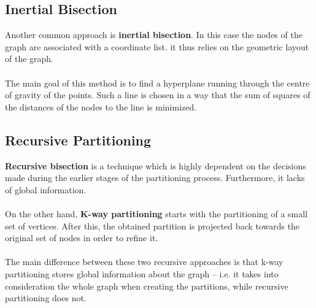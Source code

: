 \documentclass{article}
\begin{document}
\subsection{Inertial Bisection}
Another common approach is \textbf{inertial bisection}. In this case the nodes of the graph are associated with a coordinate list. it thus relies on the geometric layout of the graph. \\ \\
The main goal of this method is to find a hyperplane running through the centre of gravity of the points. Such a line is chosen in a way that the sum of squares of the distances of the nodes to the line is minimized.

\subsection{Recursive Partitioning}
\textbf{Recursive bisection} is a technique which is highly dependent on the decisions made during the earlier stages of the partitioning process. Furthermore, it lacks of global information. \\ \\
On the other hand, \textbf{K-way partitioning} starts with the partitioning of a small set of vertices. After this, the obtained partition is projected back towards the original set of nodes in order to refine it. \\ \\
The main difference between these two recursive approaches is that k-way partitioning stores global information about the graph -- i.e. it takes into consideration the whole graph when creating the partitions, while recursive partitioning does not.
\end{document}
